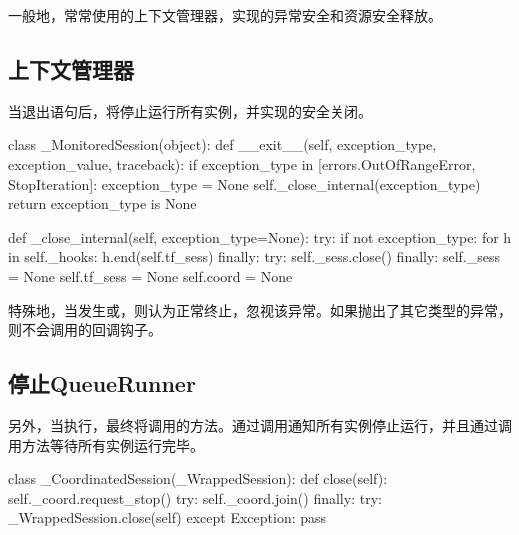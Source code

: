 \begin{content}

一般地，常常使用的上下文管理器，实现的异常安全和资源安全释放。

\subsection{上下文管理器}

当退出语句后，将停止运行所有实例，并实现的安全关闭。

\begin{leftbar}
\begin{python}
class _MonitoredSession(object):
  def __exit__(self, exception_type, exception_value, traceback):
    if exception_type in [errors.OutOfRangeError, StopIteration]:
      exception_type = None
    self._close_internal(exception_type)
    return exception_type is None
  
  def _close_internal(self, exception_type=None):
    try:
      if not exception_type:
        for h in self._hooks:
          h.end(self.tf_sess)
    finally:
      try:
        self._sess.close()
      finally:
        self._sess = None
        self.tf_sess = None
        self.coord = None  
\end{python}
\end{leftbar}

特殊地，当发生或，则认为正常终止，忽视该异常。如果抛出了其它类型的异常，则不会调用的回调钩子。

\subsection{停止QueueRunner}

另外，当执行，最终将调用的方法。通过调用通知所有实例停止运行，并且通过调用方法等待所有实例运行完毕。

\begin{leftbar}
\begin{python}
class _CoordinatedSession(_WrappedSession):
  def close(self):
    self._coord.request_stop()
    try:
      self._coord.join()
    finally:
      try:
        _WrappedSession.close(self)
      except Exception:
        pass
\end{python}
\end{leftbar}

\end{content}

